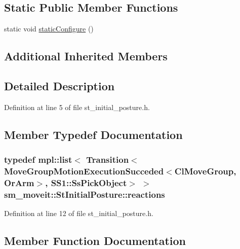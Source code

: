 \subsection*{Static Public Member Functions}
\begin{DoxyCompactItemize}
\item 
static void \hyperlink{structsm__moveit_1_1StInitialPosture_a54a2a80bf9a9b5d6838d727bc6ebff3f}{static\+Configure} ()
\end{DoxyCompactItemize}
\subsection*{Additional Inherited Members}


\subsection{Detailed Description}


Definition at line 5 of file st\+\_\+initial\+\_\+posture.\+h.



\subsection{Member Typedef Documentation}
\subsubsection[{\texorpdfstring{reactions}{reactions}}]{\setlength{\rightskip}{0pt plus 5cm}typedef mpl\+::list$<$ Transition$<${\bf Move\+Group\+Motion\+Execution\+Succeded}$<${\bf Cl\+Move\+Group}, {\bf Or\+Arm}$>$, {\bf S\+S1\+::\+Ss\+Pick\+Object}$>$ $>$ {\bf sm\+\_\+moveit\+::\+St\+Initial\+Posture\+::reactions}}\hypertarget{structsm__moveit_1_1StInitialPosture_a7e2c958b8f5fd49c37b8b7e70e72bcaa}{}\label{structsm__moveit_1_1StInitialPosture_a7e2c958b8f5fd49c37b8b7e70e72bcaa}


Definition at line 12 of file st\+\_\+initial\+\_\+posture.\+h.



\subsection{Member Function Documentation}
